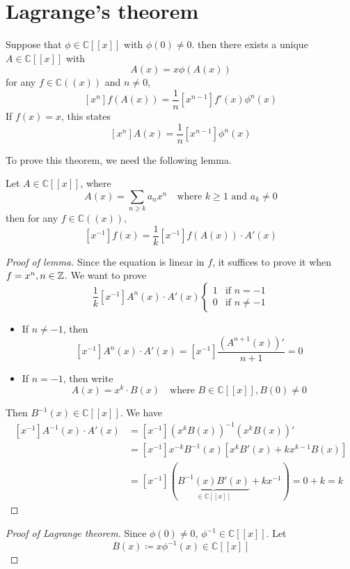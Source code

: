 \section{Lagrange's theorem}
\begin{theorem}
Suppose that \(\phi\in\mathbb{C}[[x]]\) with \(\phi(0)\neq0\).
then there exists a unique \(A\in\mathbb{C}[[x]]\) with
\[ A(x)=x\phi(A(x)) \]
for any \(f\in\mathbb{C}((x))\) and \(n\neq0\),
\[ \left[x^n\right]f(A(x))=\frac{1}{n}\left[x^{n-1}\right]f'(x)\phi^n(x) \]
If \(f(x)=x\), this states
\[ \left[x^n\right]A(x)=\frac{1}{n}\left[x^{n-1}\right]\phi^n(x) \]
\end{theorem}

To prove this theorem, we need the following lemma.
\begin{lemma}
Let \(A\in\mathbb{C}[[x]]\), where
\[ A(x)=\sum_{n\geq k}a_n x^n \quad \text{where } k\geq1 \text{ and } a_k\neq0 \]
then for any \(f\in\mathbb{C}((x))\),
\[ \left[x^{-1}\right]f(x)=\frac{1}{k}\left[x^{-1}\right]f(A(x))\cdot A'(x) \]
\end{lemma}
\begin{proof}[Proof of lemma]
Since the equation is linear in \(f\), it suffices to prove it when \(f=x^n,n\in\mathbb{Z}\).
We want to prove
\[ \frac{1}{k}\left[x^{-1}\right]A^n(x)\cdot A'(x)\begin{cases} 1 & \text{if } n=-1 \\ 0 & \text{if } n\neq-1\end{cases} \]
\begin{itemize}
\item If \(n\neq-1\), then
\[ \left[x^{-1}\right]A^n(x)\cdot A'(x)=\left[x^{-1}\right]\frac{\left(A^{n+1}(x)\right)'}{n+1}=0 \]
\item If \(n=-1\), then write
\[ A(x)=x^k\cdot B(x) \quad \text{where } B\in\mathbb{C}[[x]], B(0)\neq0 \]
\end{itemize}
Then \(B^{-1}(x)\in\mathbb{C}[[x]]\).
We have
\begin{align*}
\left[x^{-1}\right]A^{-1}(x)\cdot A'(x)&=\left[x^{-1}\right]\left(x^kB(x)\right)^{-1}\left(x^kB(x)\right)'\\
&=\left[x^{-1}\right]x^{-k}B^{-1}(x)\left[x^kB'(x)+kx^{k-1}B(x)\right]\\
&=\left[x^{-1}\right](\underbrace{B^{-1}(x)B'(x)}_{\in\mathbb{C}[[x]]}+kx^{-1})=0+k=k
\end{align*}
\end{proof}

\begin{proof}[Proof of Lagrange theorem]
Since \(\phi(0)\neq0\), \(\phi^{-1}\in\mathbb{C}[[x]]\).
Let
\[ B(x)\coloneqq x\phi^{-1}(x)\in\mathbb{C}[[x]] \]
\end{proof}